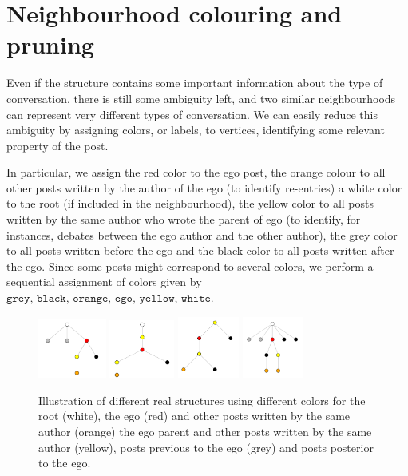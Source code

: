 \documentclass[conference]{IEEEtran}
\begin{document}
\section{Neighbourhood colouring and pruning}\label{sec:colouring_pruning}
Even if the structure contains some important information about the type of conversation, there is still some ambiguity left, and two similar neighbourhoods can represent very different types of conversation. We can easily reduce this ambiguity by assigning colors, or labels, to vertices, identifying some relevant property of the post. 

In particular, we assign the red color to the ego post, the orange colour to all other posts written by the author of the ego (to identify re-entries) a white color to the root (if included in the neighbourhood), the yellow color to all posts written by the same author who wrote the parent of ego (to identify, for instances, debates between the ego author and the other author), the grey color to all posts written before the ego and the black color to all posts written after the ego. Since some posts might correspond to several colors, we perform a sequential assignment of colors given by $\texttt{grey, black, orange, ego, yellow, white}$. 

\begin{figure}
\centering
\includegraphics[width=0.2\textwidth]{neighbourhood_time_342}
\includegraphics[width=0.19\textwidth]{neighbourhood_time_456}
\includegraphics[width=0.18\textwidth]{neighbourhood_time_501}
\includegraphics[width=0.18\textwidth]{neighbourhood_time_524}
\caption{Illustration of different real structures using different colors for the root (white), the ego (red) and other posts written by the same author (orange) the ego parent and other posts written by the same author (yellow), posts previous to the ego (grey) and posts posterior to the ego.}
\label{fig:colors}
\end{figure}
\end{document}

